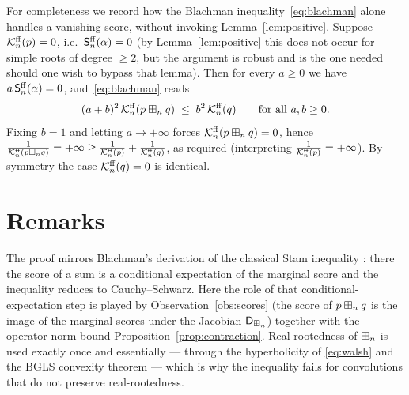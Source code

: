 \begin{qfourobservation}[the degenerate case $\qfourInfo=0$ in general]\label{obs:degenerate}
For completeness we record how the Blachman inequality~\eqref{eq:blachman} alone
handles a vanishing score, without invoking Lemma~\ref{lem:positive}. Suppose
$\mathcal{K}^{\mathrm{ff}}_n(p)=0$, i.e.\ $\mathsf{S}^{\mathrm{ff}}_n(\alpha)=0$ (by Lemma~\ref{lem:positive} this
does not occur for simple roots of degree $\ge2$, but the argument is robust and is
the one needed should one wish to bypass that lemma). Then for every $a\ge0$ we have
$a\,\mathsf{S}^{\mathrm{ff}}_n(\alpha)=0$, and~\eqref{eq:blachman} reads
\[
(a+b)^2\,\mathcal{K}^{\mathrm{ff}}_n(p\boxplus_n q)\;\le\;b^2\,\mathcal{K}^{\mathrm{ff}}_n(q)\qquad\text{for all }a,b\ge0 .
\]
Fixing $b=1$ and letting $a\to+\infty$ forces $\mathcal{K}^{\mathrm{ff}}_n(p\boxplus_n q)=0$, hence
$\tfrac{1}{\mathcal{K}^{\mathrm{ff}}_n(p\boxplus_n q)}=+\infty\ge\tfrac{1}{\mathcal{K}^{\mathrm{ff}}_n(p)}+\tfrac{1}{\mathcal{K}^{\mathrm{ff}}_n(q)}$,
as required (interpreting $\tfrac1{\mathcal{K}^{\mathrm{ff}}_n(p)}=+\infty$). By symmetry the case
$\mathcal{K}^{\mathrm{ff}}_n(q)=0$ is identical.
\end{qfourobservation}

\section*{Remarks}

The proof mirrors Blachman's \cite{Blachman} derivation of the classical Stam
inequality \cite{Stam}: there the score of a sum is a conditional expectation of
the marginal score and the inequality reduces to Cauchy--Schwarz. Here the role
of that conditional-expectation step is played by
Observation~\ref{obs:scores} (the score of $p\boxplus_n q$ is the image of the marginal
scores under the Jacobian $\mathsf{D}_{\boxplus_n}$) together with the operator-norm bound
Proposition~\ref{prop:contraction}. Real-rootedness of $\boxplus_n$ is used exactly
once and essentially — through the hyperbolicity of \eqref{eq:walsh} and the
BGLS convexity theorem — which is why the inequality fails for convolutions that
do not preserve real-rootedness.

